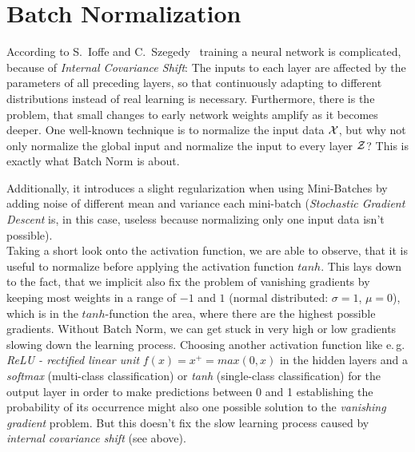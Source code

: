 \documentclass[dvipsnames,twocolumn]{scrartcl}
\begin{document}
	
	\section{Batch Normalization}
	
	According to S.~Ioffe and C.~Szegedy~\cite{batchnorm} training a neural network is complicated, because of \emph{Internal Covariance Shift}: The inputs to each layer are affected by the parameters of all preceding layers, so that continuously adapting to different distributions instead of real learning is necessary. Furthermore, there is the problem, that small changes to early network weights amplify as it becomes deeper. One well-known technique is to normalize the input data $\cal X$, but why not only normalize the global input and normalize the input to every layer $\cal Z$? This is exactly what Batch Norm is about.
	
	Additionally, it introduces a slight regularization when using Mini-Batches by adding noise of different mean and variance each mini-batch (\emph{Stochastic Gradient Descent} is, in this case, useless because normalizing only one input data isn't possible).\\
	
	Taking a short look onto the activation function, we are able to observe, that it is useful to normalize before applying the activation function $tanh$. This lays down to the fact, that we implicit also fix the problem of vanishing gradients by keeping most weights in a range of $-1$ and $1$ (normal distributed: $\sigma = 1$, $\mu = 0$), which is in the $tanh$-function the area, where there are the highest possible gradients. Without Batch Norm, we can get stuck in very high or low gradients slowing down the learning process. Choosing another activation function like e.\,g. \emph{ReLU - rectified linear unit} $f(x) = x^+ = max(0,x)$ in the hidden layers and a \emph{softmax} (multi-class classification) or \emph{tanh} (single-class classification) for the output layer in order to make predictions between 0 and 1 establishing the probability of its occurrence might also one possible solution to the \emph{vanishing gradient} problem. But this doesn't fix the slow learning process caused by \emph{internal covariance shift} (see above).
	
\end{document}
